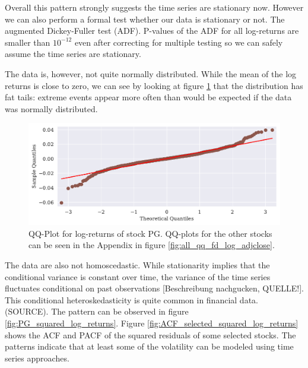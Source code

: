 \begin{table}[h!]
    \centering
    \begin{adjustbox}{width = 0.95\linewidth}
    
    \end{adjustbox}
    \caption{}
    \label{tab:log return means}
\end{table}{}

Overall this pattern strongly suggests the time series are stationary now. However we can also perform a formal test whether our data is stationary or not. The augmented Dickey-Fuller test (ADF). P-values of the ADF for all log-returns are smaller than $10^{-12}$ even after correcting for multiple testing so we can safely assume the time series are stationary. 

The data is, however, not quite normally distributed. While the mean of the log returns is close to zero, we can see by looking at figure \ref{fig:PG_qq_fd_log_adjclose} that the distribution has fat tails: extreme events appear more often than would be expected if the data was normally distributed. 

\begin{figure}[h]
    \centering
    \begin{adjustbox}{width=.9\textwidth,center}
    \includegraphics[]{figures/PG_log_adjclose_fd_and_qq.pdf}
    \end{adjustbox}  
    \caption{QQ-Plot for log-returns of stock PG. QQ-plots for the other stocks can be seen in the Appendix in figure \ref{fig:all_qq_fd_log_adjclose}.}
    \label{fig:PG_qq_fd_log_adjclose}
\end{figure}{}

The data are also not homoscedastic. While stationarity implies that the conditional variance is constant over time, the variance of the time series fluctuates conditional on past observations [Beschreibung nachgucken, QUELLE!]. This conditional heteroskedasticity is quite common in financial data. (SOURCE). The pattern can be observed in figure \ref{fig:PG_squared_log_returns}. Figure \ref{fig:ACF_selected_squared_log_returns} shows the ACF and PACF of the squared residuals of some selected stocks. The patterns indicate that at least some of the volatility can be modeled using time series approaches. 

